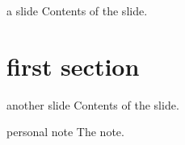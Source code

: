 \documentclass{powerdot}
\begin{document}
\begin{slide}{a slide}
  Contents of the slide.
\end{slide}
\section{first section}
\begin{slide}{another slide}
  Contents of the slide.
\end{slide}
\begin{note}{personal note}
  The note.
\end{note}
\end{document}
